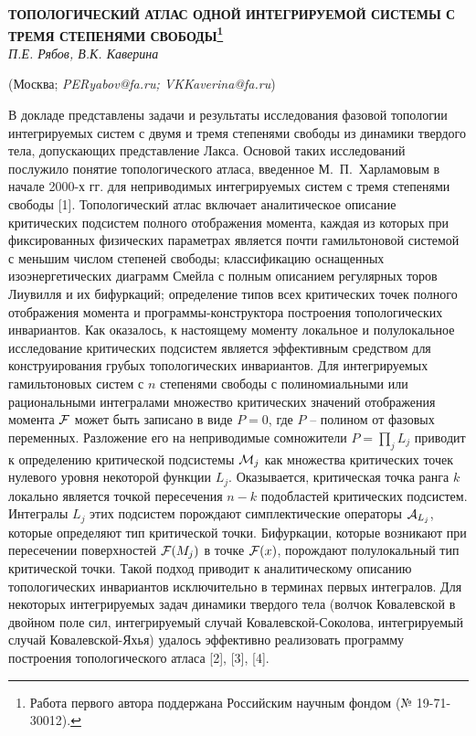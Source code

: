 
\begin{center}
    {\bf ТОПОЛОГИЧЕСКИЙ АТЛАС ОДНОЙ ИНТЕГРИРУЕМОЙ СИСТЕМЫ С ТРЕМЯ СТЕПЕНЯМИ СВОБОДЫ\footnote{Работа первого автора поддержана Российским научным фондом (№ 19-71-30012).}}\\

    {\it П.Е. Рябов, В.К. Каверина}

    (Москва; {\it PERyabov@fa.ru; VKKaverina@fa.ru})
\end{center}



В докладе представлены задачи и результаты исследования фазовой топологии интегрируемых систем с двумя и тремя степенями свободы из динамики твердого тела, допускающих представление Лакса. Основой таких исследований послужило понятие топологического атласа, введенное М.~П.~Харламовым в начале 2000-х гг. для неприводимых интегрируемых систем с тремя степенями свободы [1]. Топологический атлас включает аналитическое описание  критических подсистем полного отображения момента, каждая из которых при фиксированных физических параметрах является почти гамильтоновой системой с меньшим числом степеней свободы; классификацию оснащенных изоэнергетических  диаграмм Смейла с полным описанием регулярных торов Лиувилля и их бифуркаций; определение типов всех критических точек полного отображения момента и программы-конструктора построения топологических инвариантов. Как оказалось, к настоящему моменту локальное и полулокальное исследование критических подсистем является эффективным средством для конструирования грубых топологических инвариантов. Для интегрируемых гамильтоновых систем с $n$ степенями свободы с полиномиальными или рациональными интегралами множество критических значений отображения момента $\cal F$ может быть записано в виде $P=0$, где $P$ -- полином от фазовых переменных. Разложение его на неприводимые сомножители $P=\prod\nolimits_j {L_j}$ приводит к определению критической подсистемы ${\cal M}_j$ как множества критических точек нулевого уровня некоторой функции $L_j$. Оказывается, критическая точка ранга $k$ локально является точкой пересечения $n-k$ подобластей критических подсистем. Интегралы $L_j$ этих подсистем порождают симплектические операторы ${\cal A}_{L_j}$, которые определяют тип критической точки. Бифуркации, которые возникают при пересечении поверхностей ${\cal F}(M_j)$ в точке
${\cal F}(x)$, порождают полулокальный тип критической точки. Такой подход приводит к аналитическому описанию топологических инвариантов исключительно в терминах первых интегралов. Для некоторых интегрируемых задач динамики твердого тела  (волчок Ковалевской в двойном поле сил, интегрируемый случай Ковалевской-Соколова, интегрируемый случай Ковалевской-Яхья) удалось эффективно реализовать программу построения топологического атласа [2], [3], [4].

